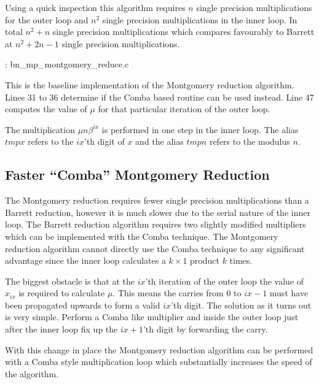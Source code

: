 \documentclass[b5paper]{book}
\begin{document}
Using a quick inspection this algorithm requires $n$ single precision multiplications for the outer loop and $n^2$ single precision multiplications 
in the inner loop.  In total $n^2 + n$ single precision multiplications which compares favourably to Barrett at $n^2 + 2n - 1$ single precision
multiplications.  

\vspace{+3mm}\begin{small}
\hspace{-5.1mm}{\bf File}: bn\_mp\_montgomery\_reduce.c
\vspace{-3mm}
\begin{alltt}
\end{alltt}
\end{small}

This is the baseline implementation of the Montgomery reduction algorithm.  Lines 31 to 36 determine if the Comba based
routine can be used instead.  Line 47 computes the value of $\mu$ for that particular iteration of the outer loop.  

The multiplication $\mu n \beta^{ix}$ is performed in one step in the inner loop.  The alias $tmpx$ refers to the $ix$'th digit of $x$ and
the alias $tmpn$ refers to the modulus $n$.  

\subsection{Faster ``Comba'' Montgomery Reduction}

The Montgomery reduction requires fewer single precision multiplications than a Barrett reduction, however it is much slower due to the serial
nature of the inner loop.  The Barrett reduction algorithm requires two slightly modified multipliers which can be implemented with the Comba
technique.  The Montgomery reduction algorithm cannot directly use the Comba technique to any significant advantage since the inner loop calculates
a $k \times 1$ product $k$ times. 

The biggest obstacle is that at the $ix$'th iteration of the outer loop the value of $x_{ix}$ is required to calculate $\mu$.  This means the 
carries from $0$ to $ix - 1$ must have been propagated upwards to form a valid $ix$'th digit.  The solution as it turns out is very simple.  
Perform a Comba like multiplier and inside the outer loop just after the inner loop fix up the $ix + 1$'th digit by forwarding the carry.  

With this change in place the Montgomery reduction algorithm can be performed with a Comba style multiplication loop which substantially increases
the speed of the algorithm.  
\end{document}
